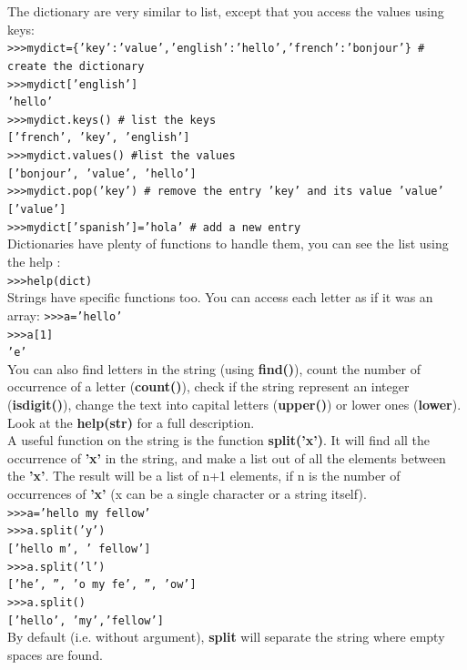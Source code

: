 \documentclass[article,10pt]{scrartcl}
\begin{document}
The dictionary are very similar to list, except that you access the values using keys:\\
\texttt{>>>mydict=\{'key':'value','english':'hello','french':'bonjour'\} \# create the dictionary}\\
\texttt{>>>mydict['english']}\\
\texttt{'hello'}\\
\texttt{>>>mydict.keys() \# list the keys}\\
\texttt{['french', 'key', 'english']}\\
\texttt{>>>mydict.values() \#list the values}\\
\texttt{['bonjour', 'value', 'hello']}\\
\texttt{>>>mydict.pop('key') \# remove the entry 'key' and its value 'value'}\\
\texttt{['value']}\\
\texttt{>>>mydict['spanish']='hola' \# add a new entry}\\
Dictionaries have plenty of functions to handle them, you can see the list using the help :\\
\texttt{>>>help(dict)}\\

Strings have specific functions too. You can access each letter as if it was an array:
\texttt{>>>a='hello'}\\
\texttt{>>>a[1]}\\
\texttt{'e'}\\
You can also find letters in the string (using \textbf{find()}), count the number of occurrence of a letter (\textbf{count()}), check if the string represent an integer (\textbf{isdigit()}), change the text into capital letters (\textbf{upper()}) or lower ones (\textbf{lower}). Look at the \textbf{help(str)} for a full description.\\
A useful function on the string is the function \textbf{split('x')}. It will find all the occurrence of \textbf{'x'} in the string, and make a list out of all the elements between the \textbf{'x'}. The result will be a list of n+1 elements, if n is the number of occurrences of \textbf{'x'} (x can be a single character or a string itself).\\
\texttt{>>>a='hello my fellow'}\\
\texttt{>>>a.split('y')}\\
\texttt{['hello m', ' fellow']}\\
\texttt{>>>a.split('l')}\\
\texttt{['he', '', 'o my fe', '', 'ow']}\\
\texttt{>>>a.split()}\\
\texttt{['hello', 'my','fellow']}\\
By default (i.e. without argument), \textbf{split} will separate the string where empty spaces are found.\\
\end{document}
